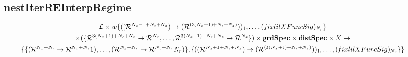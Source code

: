 \documentclass[12pt]{article}
\begin{document}
\subsection{nestIterREInterpRegime}
\label{sec:nestiterreinterp}



\begin{gather*}
  \linMod \times 
w\{(\lilXRegimeFuncSig)_1,\ldots,(\lilXFuncSig)_{\numR}\}  \\
 \times (\eqnRegimeFuncSig ) \times \grdSpec \times \dstSpec  \times \numIters \rightarrow\\
\{\frfpnsRegimeFuncSig, \{(\lilXRegimeFuncSig)_1,\ldots,(\lilXFuncSig)_{\numR}\}\}
\end{gather*}


 
 
\end{document}
